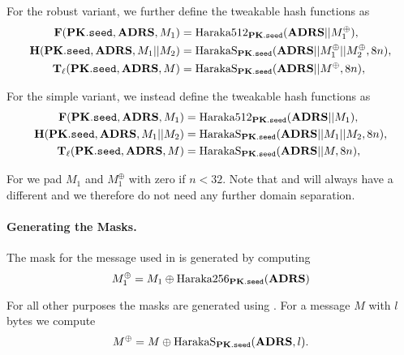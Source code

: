   For the robust variant, we further define the tweakable hash functions as
   \begin{equation}
   \begin{aligned}
      \mathbf{F}(\mathbf{PK}.\texttt{seed}, \textbf{ADRS}, M_1) &= \text{Haraka}512_{\mathbf{PK}.\texttt{seed}}(\textbf{ADRS} || M_1^{\oplus}),\\
      \mathbf{H}(\mathbf{PK}.\texttt{seed}, \textbf{ADRS}, M_1 || M_2) &=  \text{HarakaS}_{\mathbf{PK}.\texttt{seed}}(\textbf{ADRS} || 
                                           M_1^{\oplus} || M_2^{\oplus}, 8n),\\
      \mathbf{T}_\ell(\mathbf{PK}.\texttt{seed}, \textbf{ADRS}, M) &=  \text{HarakaS}_{\mathbf{PK}.\texttt{seed}}(\textbf{ADRS} || M^{\oplus}, 8n),\\
   \end{aligned}
   \end{equation}

   For the simple variant, we instead define the tweakable hash functions as
   \begin{equation}
   \begin{aligned}
      \mathbf{F}(\mathbf{PK}.\texttt{seed}, \textbf{ADRS}, M_1) &= \text{Haraka}512_{\mathbf{PK}.\texttt{seed}}(\textbf{ADRS} || M_1),\\
      \mathbf{H}(\mathbf{PK}.\texttt{seed}, \textbf{ADRS}, M_1 || M_2) &=  \text{HarakaS}_{\mathbf{PK}.\texttt{seed}}(\textbf{ADRS} || 
                                           M_1 || M_2, 8n),\\
      \mathbf{T}_\ell(\mathbf{PK}.\texttt{seed}, \textbf{ADRS}, M) &=  \text{HarakaS}_{\mathbf{PK}.\texttt{seed}}(\textbf{ADRS} || M, 8n),\\
   \end{aligned}
   \end{equation}

   For \sphincsF we pad $M_1$ and $M_1^{\oplus}$ with zero if $n < 32$.
   Note that \sphincsH 
   and \sphincsHmsg will always have a different \adrs and we therefore do not 
   need any further domain separation.

   \paragraph{Generating the Masks.} The mask for the message used in \sphincsF 
   is generated by computing
   \begin{equation}
      M_1^{\oplus} = M_1 \oplus \text{Haraka}256_{\mathbf{PK}.\texttt{seed}}(\textbf{ADRS})
   \end{equation}

   For all other purposes the masks are generated using \harakasponge. For a 
   message $M$ with $l$ bytes we compute
   \begin{equation*}
      M^{\oplus} = M \oplus \text{HarakaS}_{\mathbf{PK}.\texttt{seed}}(\textbf{ADRS}, l).
   \end{equation*}


